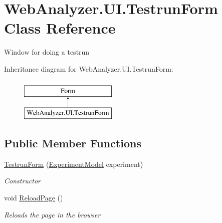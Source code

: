 \hypertarget{class_web_analyzer_1_1_u_i_1_1_testrun_form}{}\section{Web\+Analyzer.\+U\+I.\+Testrun\+Form Class Reference}
\label{class_web_analyzer_1_1_u_i_1_1_testrun_form}


Window for doing a testrun  


Inheritance diagram for Web\+Analyzer.\+U\+I.\+Testrun\+Form\+:\begin{figure}[H]
\begin{center}
\leavevmode
\includegraphics[height=2.000000cm]{class_web_analyzer_1_1_u_i_1_1_testrun_form}
\end{center}
\end{figure}
\subsection*{Public Member Functions}
\begin{DoxyCompactItemize}
\item 
\hyperlink{class_web_analyzer_1_1_u_i_1_1_testrun_form_a874c60792a2a41b12490c8361336e261}{Testrun\+Form} (\hyperlink{class_web_analyzer_1_1_models_1_1_base_1_1_experiment_model}{Experiment\+Model} experiment)
\begin{DoxyCompactList}\small\item\em Constructor \end{DoxyCompactList}\item 
void \hyperlink{class_web_analyzer_1_1_u_i_1_1_testrun_form_a672f94a3bc0ee13586c5543484a6e5bc}{Reload\+Page} ()
\begin{DoxyCompactList}\small\item\em Reloads the page in the browser \end{DoxyCompactList}\end{DoxyCompactItemize}
